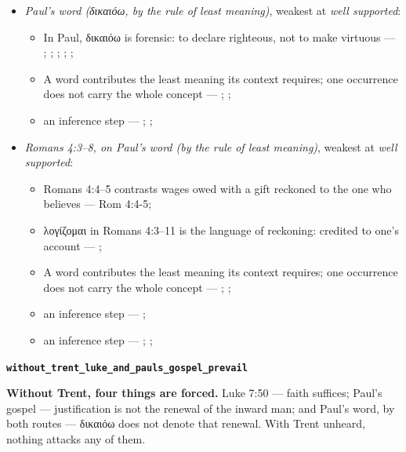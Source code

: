 \documentclass[11pt]{article}
\begin{document}
\begin{itemize}
\begin{itemize}
\item an inference step --- \cite[XI.1]{westminster-confession-1647}; \cite[III.xi.2]{calvin-institutes-1960}; \cite{morris-apostolic-preaching-1965}
\end{itemize}
\item \emph{Paul's word (δικαιόω, by the rule of least meaning)}, weakest at \emph{well supported}:
\begin{itemize}
\item In Paul, δικαιόω is forensic: to declare righteous, not to make virtuous --- \cite[s.v. δικαιόω]{bauer-danker-lexicon-2000}; \cite{morris-apostolic-preaching-1965}; \cite[p. 80]{moo-romans-1996}; \cite{irons-righteousness-of-god-2015}; \cite{wright-justification-2009}; \cite[ad loc. Rom 3:24]{fitzmyer-romans-1993}
\item A word contributes the least meaning its context requires; one occurrence does not carry the whole concept --- \cite{silva-biblical-words-1994}; \cite{joos-semantic-axiom-1972}; \cite{barr-semantics-2004}
\item an inference step --- \cite{silva-biblical-words-1994}; \cite[p. 80]{moo-romans-1996}; \cite{barr-semantics-2004}
\end{itemize}
\item \emph{Romans 4:3–8, on Paul's word (by the rule of least meaning)}, weakest at \emph{well supported}:
\begin{itemize}
\item Romans 4:4–5 contrasts wages owed with a gift reckoned to the one who believes --- Rom 4:4-5; \cite[III.xi.18]{calvin-institutes-1960}
\item λογίζομαι in Romans 4:3–11 is the language of reckoning: credited to one's account --- \cite[s.v. λογίζομαι]{bauer-danker-lexicon-2000}; \cite[ad loc. Rom 4:3]{moo-romans-1996}
\item A word contributes the least meaning its context requires; one occurrence does not carry the whole concept --- \cite{silva-biblical-words-1994}; \cite{joos-semantic-axiom-1972}; \cite{barr-semantics-2004}
\item an inference step --- \cite[ad loc. Rom 4:6]{moo-romans-1996}; \cite[s.v. λογίζομαι]{bauer-danker-lexicon-2000}
\item an inference step --- \cite{silva-biblical-words-1994}; \cite[p. 80]{moo-romans-1996}; \cite{barr-semantics-2004}
\end{itemize}
\end{itemize}
\par\medskip\noindent\textbf{\texttt{without\_\allowbreak{}trent\_\allowbreak{}luke\_\allowbreak{}and\_\allowbreak{}pauls\_\allowbreak{}gospel\_\allowbreak{}prevail}}\par\nobreak\noindent
\textbf{Without Trent, four things are forced.} Luke 7:50 — faith suffices; Paul's gospel — justification is not the renewal of the inward man; and Paul's word, by both routes — δικαιόω does not denote that renewal. With Trent unheard, nothing attacks any of them.
\end{document}
